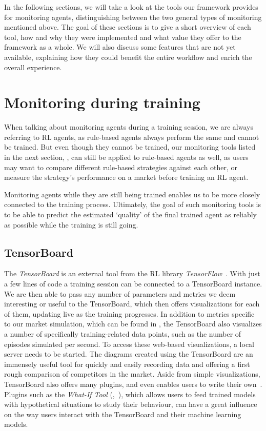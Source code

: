 In the following sections, we will take a look at the tools our framework provides for monitoring agents, distinguishing between the two general types of monitoring mentioned above. The goal of these sections is to give a short overview of each tool, how and why they were implemented and what value they offer to the framework as a whole. We will also discuss some features that are not yet available, explaining how they could benefit the entire workflow and enrich the overall experience.

\section{Monitoring during training}\label{sec:DuringTraining}

When talking about monitoring agents during a training session, we are always referring to RL agents, as rule-based agents always perform the same and cannot be trained. But even though they cannot be trained, our monitoring tools listed in the next section, , can still be applied to rule-based agents as well, as users may want to compare different rule-based strategies against each other, or measure the strategy's performance on a market before training an RL agent.

Monitoring agents while they are still being trained enables us to be more closely connected to the training process. Ultimately, the goal of such monitoring tools is to be able to predict the estimated `quality' of the final trained agent as reliably as possible while the training is still going.

\subsection{TensorBoard}\label{subsec:TensorBoard}

The \emph{TensorBoard} is an external tool from the RL library \emph{TensorFlow}~\cite{TensorFlow}. With just a few lines of code a training session can be connected to a TensorBoard instance. We are then able to pass any number of parameters and metrics we deem interesting or useful to the TensorBoard, which then offers visualizations for each of them, updating live as the training progresses. In addition to metrics specific to our market simulation, which can be found in , the TensorBoard also visualizes a number of specifically training-related data points, such as the number of episodes simulated per second. To access these web-based visualizations, a local server needs to be started. The diagrams created using the TensorBoard are an immensely useful tool for quickly and easily recording data and offering a first rough comparison of competitors in the market. Aside from simple visualizations, TensorBoard also offers many plugins, and even enables users to write their own~\cite{TensorBoardPlugins}. Plugins such as the \emph{What-If Tool} (\cite{WhatIfTool},~\cite{WhatIfToolWeb}), which allows users to feed trained models with hypothetical situations to study their behaviour, can have a great influence on the way users interact with the TensorBoard and their machine learning models.

